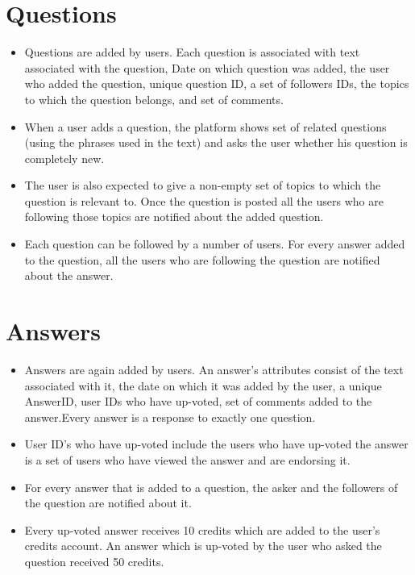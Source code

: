 \documentclass{article}
\begin{document}
\section{Questions}
\begin{itemize}
\item Questions are added by users. Each question is associated with text associated with the question, Date on which question was added, the user who added the question, unique question ID, a set of followers IDs, the topics to which the question belongs, and set of comments.
\item When a user adds a question, the platform shows set of related questions (using the phrases used in the text) and asks the user whether his question is completely new.
\item The user is also expected to give a non-empty set of topics to which the question is relevant to. Once the question is posted all the users who are following those topics are notified about the added question.
\item Each question can be followed by a number of users. For every answer added to the question, all the users who are following the question are notified  about the answer.
\end{itemize}
 

\section{Answers}
\begin{itemize}
\item Answers are again added by users. An answer’s attributes consist of the text associated with it, the date on which it was added by the user, a unique AnswerID, user IDs who have up-voted, set of comments added to the answer.Every answer is a response to exactly one question.
\item User ID's who have up-voted include the users who have up-voted the answer is a set of users who have viewed the answer and are endorsing it.
\item For every answer that is added to a question, the asker and the followers of the question are notified about it.
\item Every up-voted answer receives 10 credits which are added to the user's credits account. An answer which is up-voted by the user who asked the question received 50 credits.
\end{itemize}
  
\end{document}
